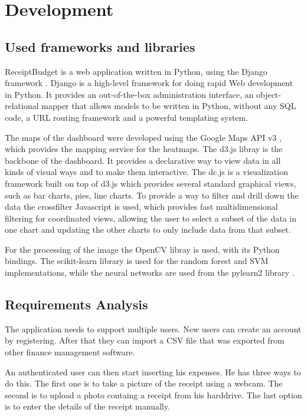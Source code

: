 \section{Development}

\subsection{Used frameworks and libraries}
ReceiptBudget is a web application written in Python, using the Django framework \cite{django}. Django is a high-level framework for doing rapid Web development in Python. It provides an out-of-the-box administration interface, an object-relational mapper that allows models to be written in Python, without any SQL code, a URL routing framework and a powerful templating system.

The maps of the dashboard were developed using the Google Maps API v3 \cite{gmapsjs}, which provides the mapping service for the heatmaps. The d3.js libray \cite{bostock2011d3} is the backbone of the dashboard. It provides a declarative way to view data in all kinds of visual ways and to make them interactive. The dc.js is a visualization framework built on top of d3.js which provides several standard graphical views, such as bar charts, pies, line charts. To provide a way to filter and drill down the data the crossfilter Javascript is used, which provides fast multidimensional filtering for coordinated views, allowing the user to select a subset of the data in one chart and updating the other charts to only include data from that subset. 

For the processing of the image the OpenCV libray is used, with its Python bindings. The scikit-learn library \cite{pedregosa2011scikit} is used for the random forest and SVM implementations, while the neural networks are used from the pylearn2 library \cite{goodfellow2013pylearn2}. 
\subsection{Requirements Analysis}
The application needs to support multiple users. New users can create an account by registering. After that they can import a CSV file that was exported from other finance management software. 

An authenticated user can then start inserting his expenses. He has three ways to do this. The first one is to take a picture of the receipt using a webcam. The second is to upload a photo containg a receipt from his harddrive. The last option is to enter the details of the receipt manually. 

